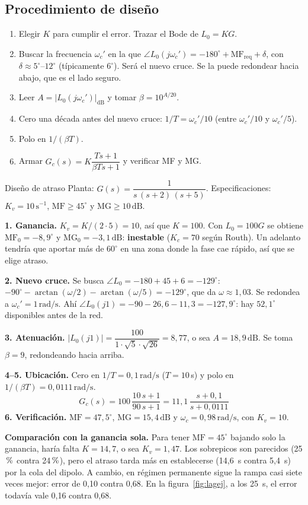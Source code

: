 \documentclass[11pt,a4paper]{article}
\newcounter{ejemplo}
\newenvironment{ejemplo}[1]{\refstepcounter{ejemplo}\begin{ejemplobox}{#1}}{\end{ejemplobox}}
\newcommand{\pct}{\ensuremath{\,\mathchar"7025}}
\newcommand{\dB}{\,\mathrm{dB}}
\newcommand{\rads}{\,\mathrm{rad/s}}
\newcommand{\MF}{\mathrm{MF}}
\newcommand{\MG}{\mathrm{MG}}
\newcommand{\wc}{\omega_c}
\begin{document}
\subsection{Procedimiento de diseño}
\begin{receta}
\begin{enumerate}[label=\textbf{\arabic*.}]
\item Elegir $K$ para cumplir el error. Trazar el Bode de $L_0=KG$.
\item Buscar la frecuencia $\wc'$ en la que $\angle L_0(j\wc')=-180^\circ+\MF_{\text{req}}+\delta$, con $\delta\approx5^\circ$--$12^\circ$
      (típicamente $6^\circ$). Será el nuevo cruce. Se la puede redondear hacia abajo, que es el lado seguro.
\item Leer $A=|L_0(j\wc')|_{\mathrm{dB}}$ y tomar $\beta=10^{A/20}$.
\item Cero una década antes del nuevo cruce: $1/T=\wc'/10$ (entre $\wc'/10$ y $\wc'/5$).
\item Polo en $1/(\beta T)$.
\item Armar $G_c(s)=K\dfrac{Ts+1}{\beta Ts+1}$ y verificar MF y MG.
\end{enumerate}
\end{receta}

\begin{ejemplo}{Diseño de atraso}
\label{ej:lag}
Planta: $G(s)=\dfrac{1}{s\,(s+2)\,(s+5)}$. Especificaciones: $K_v=10\,\mathrm{s^{-1}}$, $\MF\ge45^\circ$ y $\MG\ge10\dB$.

\textbf{1. Ganancia.} $K_v=K/(2\cdot5)=10$, así que $K=100$. Con $L_0=100G$ se obtiene $\MF_0=-8{,}9^\circ$ y $\MG_0=-3{,}1\dB$:
\textbf{inestable} ($K_c=70$ según Routh). Un adelanto tendría que aportar más de $60^\circ$ en una zona donde la fase cae rápido, así que se elige atraso.

\textbf{2. Nuevo cruce.} Se busca $\angle L_0=-180+45+6=-129^\circ$:
$-90^\circ-\arctan(\omega/2)-\arctan(\omega/5)=-129^\circ$, que da $\omega\approx1{,}03$. Se redondea a $\wc'=1\rads$.
Ahí $\angle L_0(j1)=-90-26{,}6-11{,}3=-127{,}9^\circ$: hay $52{,}1^\circ$ disponibles antes de la red.

\textbf{3. Atenuación.} $|L_0(j1)|=\dfrac{100}{1\cdot\sqrt5\cdot\sqrt{26}}=8{,}77$, o sea $A=18{,}9\dB$. Se toma $\beta=9$, redondeando hacia arriba.

\textbf{4--5. Ubicación.} Cero en $1/T=0{,}1\rads$ ($T=10$\,s) y polo en $1/(\beta T)=0{,}0111\rads$.
\[
\boxed{G_c(s)=100\,\frac{10\,s+1}{90\,s+1}=11{,}1\,\frac{s+0{,}1}{s+0{,}0111}}
\]
\textbf{6. Verificación.} $\MF=47{,}5^\circ$, $\MG=15{,}4\dB$ y $\wc=0{,}98\rads$, con $K_v=10$. \checkmark

\textbf{Comparación con la ganancia sola.} Para tener $\MF=45^\circ$ bajando solo la ganancia, haría falta $K=14{,}7$, o sea $K_v=1{,}47$.
Los sobrepicos son parecidos (25\pct{} contra 24\pct{}), pero el atraso tarda más en establecerse (14,6~s contra 5,4~s) por la cola del dipolo.
A cambio, en régimen permanente sigue la rampa casi siete veces mejor: error de 0,10 contra 0,68. En la figura~\ref{fig:lagej}, a los 25~s,
el error todavía vale 0,16 contra 0,68.
\end{ejemplo}
\end{document}
